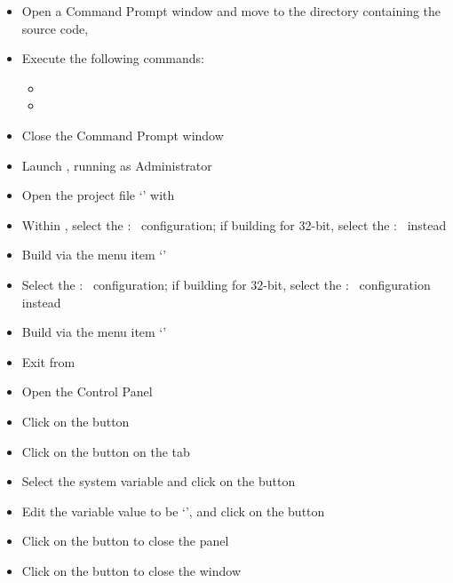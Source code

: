 \begin{itemize}
\item Open a Command Prompt window and move to the directory containing the \mplusm{}
source code, 
\item\exSp{}Execute the following commands:
\begin{itemize}
\item{}
\item\exSp{}
\end{itemize}
\item\exSp{}Close the Command Prompt window
\item\exSp{}Launch , running as Administrator
\item\exSp{}Open the project file
`' with
\item\exSp{}Within , select the  :\ 
configuration; if building for 32-bit, select the  :\  instead
\item\exSp{}Build via the menu item `'
\item\exSp{}Select the  :\  configuration; if building for
32-bit, select the  :\  configuration instead
\item\exSp{}Build via the menu item `'
\item\exSp{}Exit from 
\item\exSp{}Open the  Control Panel
\item\exSp{}Click on the  button
\item\exSp{}Click on the  button on the 
tab
\item\exSp{}Select the  system variable and click on the 
button 
\item\exSp{}Edit the variable value to be `',
and click on the  button
\item\exSp{}Click on the  button to close the 
panel
\item\exSp{}Click on the  button to close the 
window
\end{itemize}
